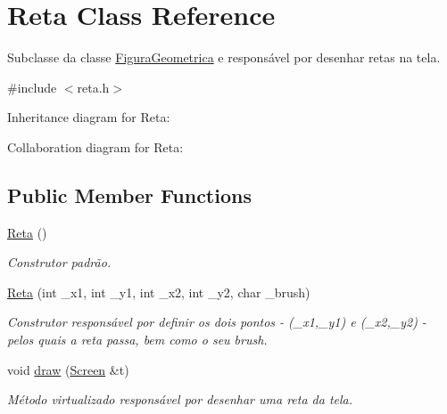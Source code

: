 \hypertarget{class_reta}{}\section{Reta Class Reference}
\label{class_reta}


Subclasse da classe \hyperlink{class_figura_geometrica}{Figura\+Geometrica} e responsável por desenhar retas na tela.  




{\ttfamily \#include $<$reta.\+h$>$}



Inheritance diagram for Reta\+:


Collaboration diagram for Reta\+:
\subsection*{Public Member Functions}
\begin{DoxyCompactItemize}
\item 
\mbox{\label{class_reta_ab4754dffc985acd6cf4eec6f9bac668a}} 
\hyperlink{class_reta_ab4754dffc985acd6cf4eec6f9bac668a}{Reta} ()
\begin{DoxyCompactList}\small\item\em Construtor padrão. \end{DoxyCompactList}\item 
\mbox{\label{class_reta_a628da4bbb0325dec5eebcf5dc286bf20}} 
\hyperlink{class_reta_a628da4bbb0325dec5eebcf5dc286bf20}{Reta} (int \+\_\+x1, int \+\_\+y1, int \+\_\+x2, int \+\_\+y2, char \+\_\+brush)
\begin{DoxyCompactList}\small\item\em Construtor responsável por definir os dois pontos -\/ (\+\_\+x1,\+\_\+y1) e (\+\_\+x2,\+\_\+y2) -\/ pelos quais a reta passa, bem como o seu brush. \end{DoxyCompactList}\item 
\mbox{\label{class_reta_ac2e9805183cd474b62bffd8b032cd780}} 
void \hyperlink{class_reta_ac2e9805183cd474b62bffd8b032cd780}{draw} (\hyperlink{class_screen}{Screen} \&t)
\begin{DoxyCompactList}\small\item\em Método virtualizado responsável por desenhar uma reta da tela. \end{DoxyCompactList}\end{DoxyCompactItemize}
